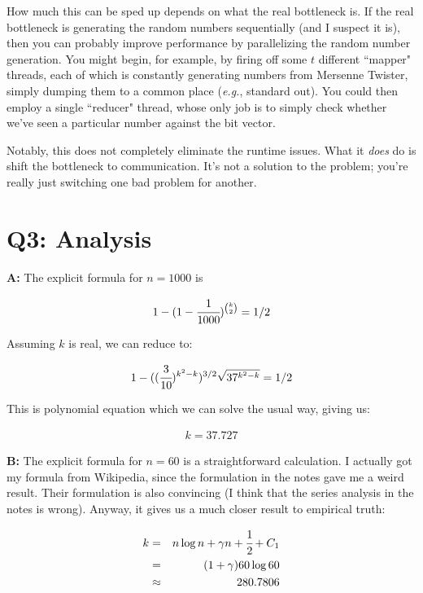 \documentclass[11pt]{article}
\begin{document}
How much this can be sped up depends on what the real bottleneck is. If the real bottleneck is generating the random numbers sequentially (and I suspect it is), then you can probably improve performance by parallelizing the random number generation. You might begin, for example, by firing off some $t$ different ``mapper" threads, each of which is constantly generating numbers from Mersenne Twister, simply dumping them to a common place (\textit{e.g.}, standard out). You could then employ a single ``reducer" thread, whose only job is to simply check whether we've seen a particular number against the bit vector.

Notably, this does not completely eliminate the runtime issues. What it \textit{does} do is shift the bottleneck to communication. It's not a solution to the problem; you're really just switching one bad problem for another.


\section*{Q3: Analysis}

\textbf{A:} The explicit formula for $n = 1000$ is

\begin{eqnarray*}
1-(1-\cfrac{1}{1000})^{k \choose 2} = 1/2
\end{eqnarray*}

Assuming $k$ is real, we can reduce to:

\begin{eqnarray*}
1 - ((\cfrac{3}{10})^{k^2-k})^{3/2} \sqrt{37^{k^2-k}} = 1/2
\end{eqnarray*}

This is polynomial equation which we can solve the usual way, giving us:

\begin{eqnarray*}
k = 37.727
\end{eqnarray*}


\textbf{B:} The explicit formula for $n = 60$ is a straightforward calculation. I actually got my formula from Wikipedia, since the formulation in the notes gave me a weird result. Their formulation is also convincing (I think that the series analysis in the notes is wrong). Anyway, it gives us a much closer result to empirical truth:

\begin{eqnarray*}
k & = & n \log n + \gamma n + \cfrac{1}{2} + C_1 \\
& = & (1 + \gamma) 60 \log 60 \\
& \approx & 280.7806
\end{eqnarray*}
\end{document}
